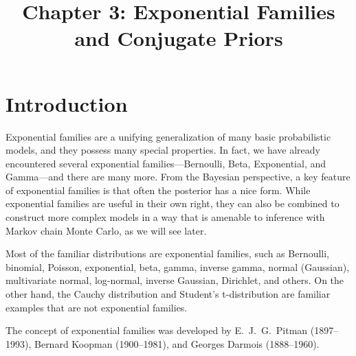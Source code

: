 \documentclass[12pt]{article}
\title{Chapter 3: Exponential Families and Conjugate Priors}
\author{}
\date{}
\begin{document}
\maketitle

\tableofcontents 

\thispagestyle{firststyle}

\vspace{5em}

\section{Introduction}

Exponential families are a unifying generalization of many basic probabilistic models, and they possess many special properties. In fact, we have already encountered several exponential families---Bernoulli, Beta, Exponential, and Gamma---and there are many more. From the Bayesian perspective, a key feature of exponential families is that often the posterior has a nice form. While exponential families are useful in their own right, they can also be combined to construct more complex models in a way that is amenable to inference with Markov chain Monte Carlo, as we will see later.

Most of the familiar distributions are exponential families, such as Bernoulli, binomial, Poisson, exponential, beta, gamma, inverse gamma, normal (Gaussian), multivariate normal, log-normal, inverse Gaussian, Dirichlet, and others. On the other hand, the Cauchy distribution and Student's t-distribution are familiar examples that are not exponential families.

The concept of exponential families was developed by E.\ J.\ G.\ Pitman (1897--1993), Bernard Koopman (1900--1981), and Georges Darmois (1888--1960).
\end{document}
